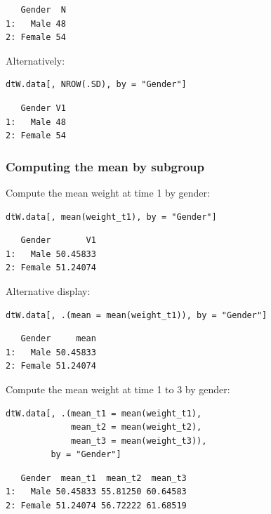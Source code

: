 \documentclass{article}
\begin{document}
\begin{verbatim}
   Gender  N
1:   Male 48
2: Female 54
\end{verbatim}


Alternatively:
\lstset{language=r,label= ,caption= ,captionpos=b,numbers=none}
\begin{lstlisting}
dtW.data[, NROW(.SD), by = "Gender"]
\end{lstlisting}

\begin{verbatim}
   Gender V1
1:   Male 48
2: Female 54
\end{verbatim}

\subsubsection{Computing the mean by subgroup}
\label{sec:orgbf87342}

Compute the mean weight at time 1 by gender:
\lstset{language=r,label= ,caption= ,captionpos=b,numbers=none}
\begin{lstlisting}
dtW.data[, mean(weight_t1), by = "Gender"]
\end{lstlisting}

\begin{verbatim}
   Gender       V1
1:   Male 50.45833
2: Female 51.24074
\end{verbatim}


Alternative display:
\lstset{language=r,label= ,caption= ,captionpos=b,numbers=none}
\begin{lstlisting}
dtW.data[, .(mean = mean(weight_t1)), by = "Gender"]
\end{lstlisting}

\begin{verbatim}
   Gender     mean
1:   Male 50.45833
2: Female 51.24074
\end{verbatim}


Compute the mean weight at time 1 to 3 by gender:
\lstset{language=r,label= ,caption= ,captionpos=b,numbers=none}
\begin{lstlisting}
dtW.data[, .(mean_t1 = mean(weight_t1),
             mean_t2 = mean(weight_t2),
             mean_t3 = mean(weight_t3)), 
         by = "Gender"]
\end{lstlisting}

\begin{verbatim}
   Gender  mean_t1  mean_t2  mean_t3
1:   Male 50.45833 55.81250 60.64583
2: Female 51.24074 56.72222 61.68519
\end{verbatim}
\end{document}

